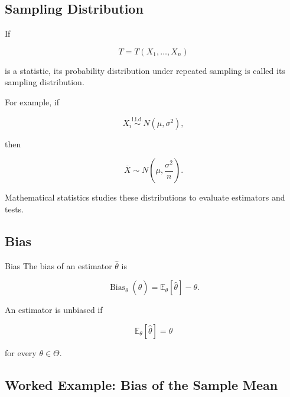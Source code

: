 \subsection{Sampling Distribution}
\label{subsec:sampling-distribution-mathematical-statistics}

If

\[
T=T(X_1,\ldots,X_n)
\]

is a statistic, its probability distribution under repeated sampling is
called its sampling distribution.

For example, if

\[
X_i
\overset{\text{i.i.d.}}{\sim}
N(\mu,\sigma^2),
\]

then

\[
\boxed{
\overline{X}
\sim
N
\left(
\mu,
\frac{\sigma^2}{n}
\right).
}
\]

Mathematical statistics studies these distributions to evaluate
estimators and tests.

\subsection{Bias}
\label{subsec:estimator-bias}

\begin{definitionbox}{Bias}
The bias of an estimator \(\widehat{\theta}\) is

\[
\boxed{
\operatorname{Bias}_\theta
(
\widehat{\theta}
)
=
\mathbb{E}_\theta
[
\widehat{\theta}
]
-
\theta.
}
\]
\end{definitionbox}

An estimator is unbiased if

\[
\boxed{
\mathbb{E}_\theta
[
\widehat{\theta}
]
=
\theta
}
\]

for every \(\theta\in\Theta\).

\subsection{Worked Example: Bias of the Sample Mean}
\label{subsec:worked-bias-sample-mean}

